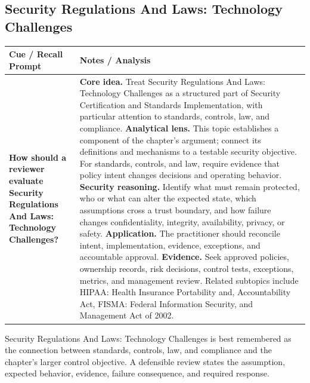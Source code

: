\documentclass[11pt]{article}
\newcommand{\CornellHeader}{%
\rowcolor{Navy}\color{white}\bfseries Cue / Recall Prompt & \color{white}\bfseries Notes / Analysis\\\hline}
\newcommand{\CornellRow}[2]{%
\cellcolor{CueGray}\RaggedRight\textbf{#1} & \RaggedRight #2\\\hline}
\begin{document}
\subsection*{Security Regulations And Laws: Technology Challenges}
\begin{longtable}{>{\RaggedRight\arraybackslash}p{}|>{\RaggedRight\arraybackslash}p{}}
\CornellHeader
\CornellRow{How should a reviewer evaluate Security Regulations And Laws: Technology Challenges?}{\textbf{Core idea.} Treat Security Regulations And Laws: Technology Challenges as a structured part of Security Certification and Standards Implementation, with particular attention to standards, controls, law, and compliance. \textbf{Analytical lens.} This topic establishes a component of the chapter's argument; connect its definitions and mechanisms to a testable security objective. For standards, controls, and law, require evidence that policy intent changes decisions and operating behavior. \textbf{Security reasoning.} Identify what must remain protected, who or what can alter the expected state, which assumptions cross a trust boundary, and how failure changes confidentiality, integrity, availability, privacy, or safety. \textbf{Application.} The practitioner should reconcile intent, implementation, evidence, exceptions, and accountable approval. \textbf{Evidence.} Seek approved policies, ownership records, risk decisions, control tests, exceptions, metrics, and management review. Related subtopics include HIPAA: Health Insurance Portability and, Accountability Act, FISMA: Federal Information Security, and Management Act of 2002.}
\end{longtable}
\begin{topicsummary}
Security Regulations And Laws: Technology Challenges is best remembered as the connection between standards, controls, law, and compliance and the chapter's larger control objective. A defensible review states the assumption, expected behavior, evidence, failure consequence, and required response.
\end{topicsummary}
\end{document}
